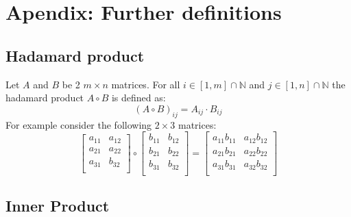 \documentclass[12pt]{article}
\begin{document}
\section{Apendix: Further definitions}
\subsection{Hadamard product}\label{sec:hadamerd_product}
Let \(A\) and \(B\) be 2 \(m \times n\) matrices. For all \(i \in [1, m]\cap\mathbb N\) and \(j \in [1, n]\cap\mathbb N\)
the hadamard product \(A \circ B\) is defined as:
\begin{equation} \label{eq:defs:Hadamard product}
\left(A \circ B\right)_{ij} = A_{ij} \cdot B_{ij}
\end{equation}
For example consider the following \(2 \times 3\) matrices:
\[
\left[
\begin{array}{ll}
a_{11} & a_{12} \\
a_{21} & a_{22} \\
a_{31} & b_{32} \\
\end{array}
\right] \circ 
\left[
\begin{array}{ll}
b_{11} & b_{12} \\
b_{21} & b_{22} \\
b_{31} & b_{32} \\
\end{array}
\right] = 
\left[
\begin{array}{ll}
a_{11}b_{11} & a_{12}b_{12} \\
a_{21}b_{21} & a_{22}b_{22} \\
a_{31}b_{31} & a_{32}b_{32} \\
\end{array}
\right]
\]

\subsection{Inner Product}
\end{document}
